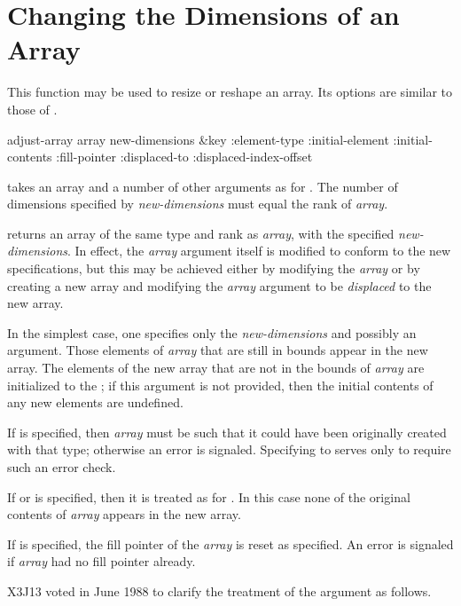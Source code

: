 \section{Changing the Dimensions of an Array}

This function may be used to resize or reshape an array.
Its options are similar to those of .

\begin{defun}[Function]
adjust-array array new-dimensions &key :element-type :initial-element :initial-contents :fill-pointer :displaced-to :displaced-index-offset

 takes an array and a number of other arguments
as for .  The number of dimensions
specified by \emph{new-dimensions} must equal the rank of \emph{array}.

 returns an array of the same type and rank as \emph{array},
with the specified \emph{new-dimensions}.  In effect, the \emph{array} argument
itself is modified to conform to the new specifications, but this may
be achieved either by modifying the \emph{array} or by creating a new
array and modifying the \emph{array} argument to be \emph{displaced} to the
new array.

In the simplest case, one specifies only the \emph{new-dimensions}
and possibly an  argument.
Those elements of \emph{array} that
are still in bounds appear in the new array.  The elements of
the new array that are not in the bounds of \emph{array} are initialized
to the ; if this argument is not provided,
then the initial contents of any new elements are undefined.

If  is specified, then \emph{array} must be such that it could have
been originally created with that type; otherwise an error is signaled.
Specifying  to  serves only to require such an
error check.

If  or 
is specified, then it is treated as for
.  In this case none of the original contents of
\emph{array} appears in the new array.

If  is specified, the fill pointer of the \emph{array}
is reset as specified.  An error is signaled if \emph{array} had no
fill pointer already.

\begin{new}
X3J13 voted in June 1988
to clarify the treatment of the 
argument as follows.


\end{new}
\end{defun}
